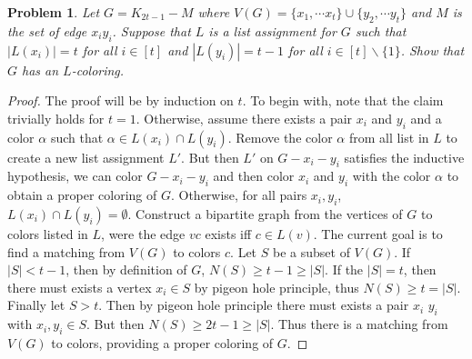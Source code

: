 \documentclass[12pt]{article}
\newtheorem{problem}{Problem}
\begin{document}
\begin{problem} Let $G=K_{2t - 1} - M$ where
  $V(G) = \{ x_1, \cdots x_t\} \cup \{y_2, \cdots y_t\}$ and $M$ is
  the set of edge $x_i y_i$. Suppose that $L$ is a list assignment for
  $G$ such that $|L(x_i)| = t$ for all $i \in [t]$ and
  $|L(y_i)| = t-1$ for all $i \in [t]\backslash \{1\}$. Show that $G$
  has an $L$-coloring.
\end{problem}
\begin{proof} The proof will be by induction on $t$. To begin with,
  note that the claim trivially holds for $t= 1$. Otherwise, assume
  there exists a pair $x_i$ and $y_i$ and a color $\alpha$ such that
  $\alpha \in L(x_i) \cap L(y_i)$. Remove the color $\alpha$ from all
  list in $L$ to create a new list assignment $L'$. But then $L'$ on
  $G-x_i -y_i$ satisfies the inductive hypothesis, we can color
  $G-x_i-y_i$ and then color $x_i$ and $y_i$ with the color $\alpha$
  to obtain a proper coloring of $G$. Otherwise, for all pairs
  $x_i, y_i$, $L(x_i) \cap L(y_i) = \emptyset$. Construct a bipartite
  graph from the vertices of $G$ to colors listed in $L$, were the
  edge $v c$ exists iff $c \in L(v)$. The current goal is to find a
  matching from $V(G)$ to colors $c$. Let $S$ be a subset of
  $V(G)$. If $|S| < t-1$, then by definition of $G$,
  $N(S) \geq t-1 \geq |S|$. If the $|S| = t$, then there must exists a
  vertex $x_i \in S$ by pigeon hole principle, thus
  $N(S) \geq t = |S|$. Finally let $S > t$. Then by pigeon hole
  principle there must exists a pair $x_i$ $y_i$ with
  $x_i, y_i \in S$. But then $N(S) \geq 2t - 1 \geq |S|$. Thus there
  is a matching from $V(G)$ to colors, providing a proper coloring of
  $G$.
\end{proof}
\end{document}
